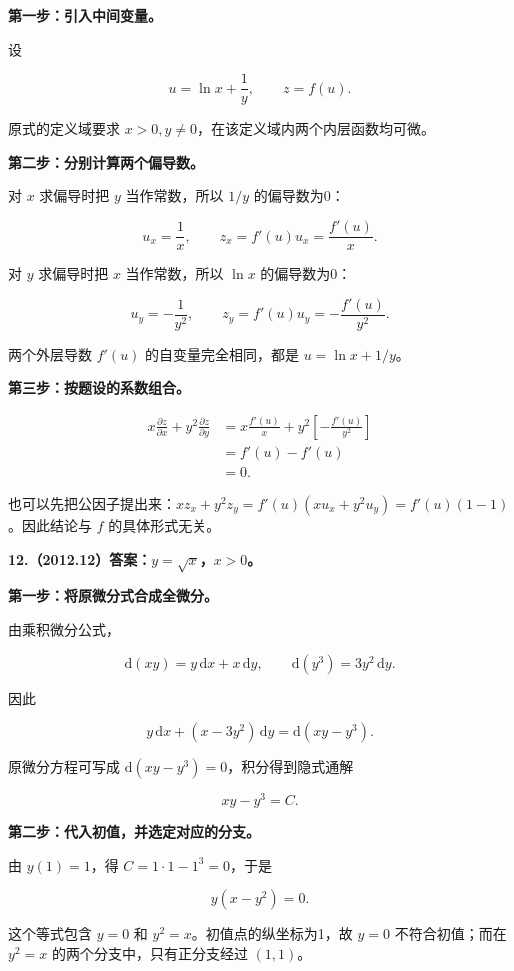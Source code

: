 \documentclass[UTF8,11pt,fontset=windows]{ctexart}
\begin{document}
\textbf{第一步：引入中间变量。}

设

$$
u=\ln x+\frac1y,
\qquad z=f(u).
$$

原式的定义域要求 $x>0,y\ne0$，在该定义域内两个内层函数均可微。

\textbf{第二步：分别计算两个偏导数。}

对 $x$ 求偏导时把 $y$ 当作常数，所以 $1/y$ 的偏导数为0：

$$
u_x=\frac1x,
\qquad
z_x=f'(u)u_x=\frac{f'(u)}x.
$$

对 $y$ 求偏导时把 $x$ 当作常数，所以 $\ln x$ 的偏导数为0：

$$
u_y=-\frac1{y^2},
\qquad
z_y=f'(u)u_y=-\frac{f'(u)}{y^2}.
$$

两个外层导数 $f'(u)$ 的自变量完全相同，都是 $u=\ln x+1/y$。

\textbf{第三步：按题设的系数组合。}

$$
\begin{aligned}
x\frac{\partial z}{\partial x}
+y^2\frac{\partial z}{\partial y}
&=x\frac{f'(u)}x
+y^2\left[-\frac{f'(u)}{y^2}\right]\\
&=f'(u)-f'(u)\\
&=0.
\end{aligned}
$$

也可以先把公因子提出来：$xz_x+y^2z_y=f'(u)(xu_x+y^2u_y)=f'(u)(1-1)$。因此结论与 $f$ 的具体形式无关。

\clearpage

\textbf{12.（2012.12）答案：$y=\sqrt x$，$x>0$。}

\textbf{第一步：将原微分式合成全微分。}

由乘积微分公式，

$$
\mathrm d(xy)=y\,\mathrm dx+x\,\mathrm dy,
\qquad
\mathrm d(y^3)=3y^2\,\mathrm dy.
$$

因此

$$
y\,\mathrm dx+(x-3y^2)\,\mathrm dy
=\mathrm d(xy-y^3).
$$

原微分方程可写成 $\mathrm d(xy-y^3)=0$，积分得到隐式通解

$$
xy-y^3=C.
$$

\textbf{第二步：代入初值，并选定对应的分支。}

由 $y(1)=1$，得 $C=1\cdot1-1^3=0$，于是

$$
y(x-y^2)=0.
$$

这个等式包含 $y=0$ 和 $y^2=x$。初值点的纵坐标为1，故 $y=0$ 不符合初值；而在 $y^2=x$ 的两个分支中，只有正分支经过 $(1,1)$。
\end{document}
